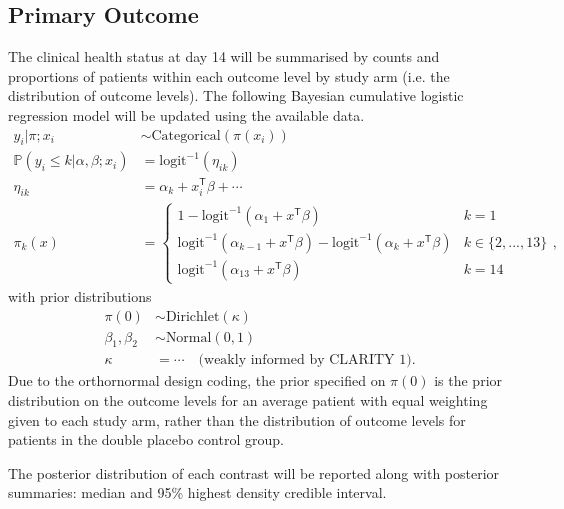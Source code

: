 \documentclass[11pt,parskip=half-]{scrartcl}
\begin{document}
\subsection{Primary Outcome}\label{sec:primary-outcome-analysis}
The clinical health status at day 14 will be summarised by counts and proportions of patients within each outcome level by study arm (i.e. the distribution of outcome levels). The following Bayesian cumulative logistic regression model will be updated using the available data.
$$
    \begin{aligned}
        y_{i} | \pi;x_i                            & \sim \text{Categorical}(\pi(x_i))           \\
        \mathbb P(y_i \leq k | \alpha, \beta; x_i) & = \text{logit}^{-1}(\eta_{ik})              \\
        \eta_{ik}                                  & = \alpha_k + x_i^{\mathsf{T}}\beta + \cdots \\
        \pi_k(x)                                   & = \begin{cases}
            1 - \text{logit}^{-1}(\alpha_1 + x^\mathsf{T}\beta)                                                     & k=1              \\
            \text{logit}^{-1}(\alpha_{k-1} + x^\mathsf{T}\beta) - \text{logit}^{-1}(\alpha_{k} + x^\mathsf{T}\beta) & k\in\{2,...,13\} \\
            \text{logit}^{-1}(\alpha_{13} + x^\mathsf{T}\beta)                                                      & k=14
        \end{cases},
    \end{aligned}
$$
with prior distributions
$$
    \begin{aligned}
        \pi(0)          & \sim \text{Dirichlet}(\kappa)                          \\
        \beta_1,\beta_2 & \sim \text{Normal}(0, 1)                               \\
        \kappa          & = \cdots  \quad \text{(weakly informed by CLARITY 1)}.
    \end{aligned}
$$
Due to the orthornormal design coding, the prior specified on $\pi(0)$ is the prior distribution on the outcome levels for an average patient with equal weighting given to each study arm, rather than the distribution of outcome levels for patients in the double placebo control group.

The posterior distribution of each contrast will be reported along with posterior summaries: median and 95\% highest density credible interval.
\end{document}
